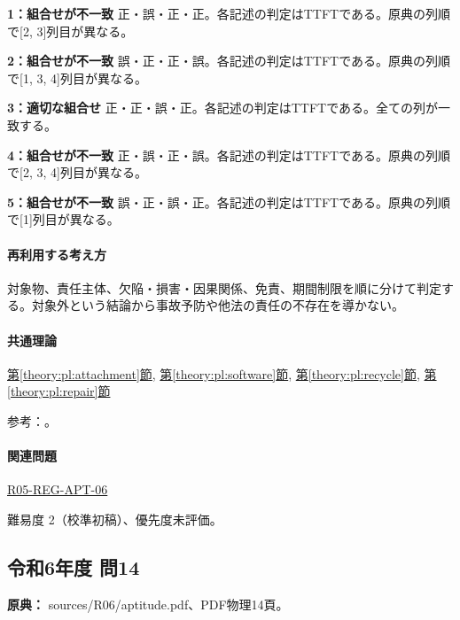 \noindent\textbf{1：組合せが不一致} 正・誤・正・正。各記述の判定はTTFTである。原典の列順で[2, 3]列目が異なる。\par

\noindent\textbf{2：組合せが不一致} 誤・正・正・誤。各記述の判定はTTFTである。原典の列順で[1, 3, 4]列目が異なる。\par

\noindent\textbf{3：適切な組合せ} 正・正・誤・正。各記述の判定はTTFTである。全ての列が一致する。\par

\noindent\textbf{4：組合せが不一致} 正・誤・正・誤。各記述の判定はTTFTである。原典の列順で[2, 3, 4]列目が異なる。\par

\noindent\textbf{5：組合せが不一致} 誤・正・誤・正。各記述の判定はTTFTである。原典の列順で[1]列目が異なる。\par

\paragraph{再利用する考え方} 対象物、責任主体、欠陥・損害・因果関係、免責、期間制限を順に分けて判定する。対象外という結論から事故予防や他法の責任の不存在を導かない。

\paragraph{共通理論} \hyperref[theory:pl:attachment]{第\ref*{theory:pl:attachment}節}, \hyperref[theory:pl:software]{第\ref*{theory:pl:software}節}, \hyperref[theory:pl:recycle]{第\ref*{theory:pl:recycle}節}, \hyperref[theory:pl:repair]{第\ref*{theory:pl:repair}節}

\par 参考：\cite{pl_statute,pl_qa,pl_definitions2018}。

\paragraph{関連問題} \hyperref[q:r05-reg-apt-06]{R05-REG-APT-06}

\par 難易度 2（校準初稿）、優先度未評価。

\subsection{令和6年度 問14}
\label{q:r06-reg-apt-14}

\noindent\textbf{原典：} sources/R06/aptitude.pdf、PDF物理14頁。

